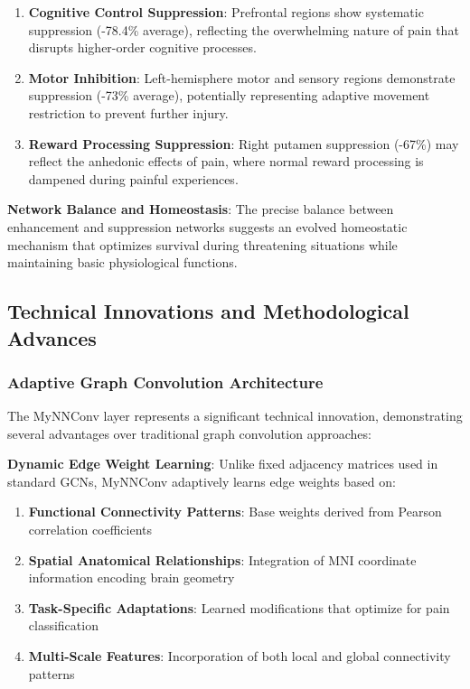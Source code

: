 \begin{enumerate}
\item \textbf{Cognitive Control Suppression}: Prefrontal regions show systematic suppression (-78.4\% average), reflecting the overwhelming nature of pain that disrupts higher-order cognitive processes.

\item \textbf{Motor Inhibition}: Left-hemisphere motor and sensory regions demonstrate suppression (-73\% average), potentially representing adaptive movement restriction to prevent further injury.

\item \textbf{Reward Processing Suppression}: Right putamen suppression (-67\%) may reflect the anhedonic effects of pain, where normal reward processing is dampened during painful experiences.
\end{enumerate}

\textbf{Network Balance and Homeostasis}:
The precise balance between enhancement and suppression networks suggests an evolved homeostatic mechanism that optimizes survival during threatening situations while maintaining basic physiological functions.

\subsection{Technical Innovations and Methodological Advances}

\subsubsection{Adaptive Graph Convolution Architecture}

The MyNNConv layer represents a significant technical innovation, demonstrating several advantages over traditional graph convolution approaches:

\textbf{Dynamic Edge Weight Learning}:
Unlike fixed adjacency matrices used in standard GCNs, MyNNConv adaptively learns edge weights based on:

\begin{enumerate}
\item \textbf{Functional Connectivity Patterns}: Base weights derived from Pearson correlation coefficients
\item \textbf{Spatial Anatomical Relationships}: Integration of MNI coordinate information encoding brain geometry
\item \textbf{Task-Specific Adaptations}: Learned modifications that optimize for pain classification
\item \textbf{Multi-Scale Features}: Incorporation of both local and global connectivity patterns
\end{enumerate}

